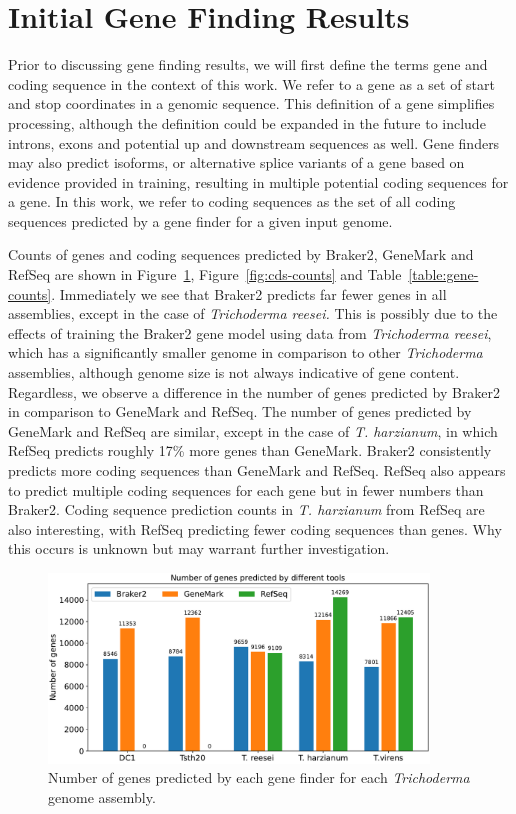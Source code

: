 \section{Initial Gene Finding Results}\label{section:gene-finding}

Prior to discussing gene finding results, we will first define the
terms gene and coding sequence in the context of this work. We refer
to a gene as a set of start and stop coordinates in a genomic
sequence. This definition of a gene simplifies processing, although
the definition could be expanded in the future to include introns,
exons and potential up and downstream sequences as well. Gene finders
may also predict isoforms, or alternative splice variants of a gene
based on evidence provided in training, resulting in multiple
potential coding sequences for a gene. In this work, we refer to
coding sequences as the set of all coding sequences predicted by a
gene finder for a given input genome.

Counts of genes and coding sequences predicted by Braker2, GeneMark
and RefSeq are shown in Figure~\ref{fig:gene-counts},
Figure~\ref{fig:cds-counts} and
Table~\ref{table:gene-counts}. Immediately we see that Braker2
predicts far fewer genes in all assemblies, except in the case of
\textit{Trichoderma reesei.} This is possibly due to the effects of
training the Braker2 gene model using data from \textit{Trichoderma
  reesei}, which has a significantly smaller genome in comparison to
other \textit{Trichoderma} assemblies, although genome size is not
always indicative of gene content. Regardless, we observe a difference
in the number of genes predicted by Braker2 in comparison to GeneMark
and RefSeq. The number of genes predicted by GeneMark and RefSeq are
similar, except in the case of \textit{T. harzianum}, in which RefSeq
predicts roughly 17\% more genes than GeneMark. Braker2 consistently
predicts more coding sequences than GeneMark and RefSeq. RefSeq also
appears to predict multiple coding sequences for each gene but in
fewer numbers than Braker2. Coding sequence prediction counts in
\textit{T. harzianum} from RefSeq are also interesting, with RefSeq
predicting fewer coding sequences than genes. Why this occurs is
unknown but may warrant further investigation.

\begin{figure}
  \centering
  \includegraphics[width=0.9\textwidth]{figures/gene-counts-barplot.pdf}
  \caption[Number of genes predicted]{Number of genes predicted by each gene finder for each \textit{Trichoderma} genome assembly.}\label{fig:gene-counts}
\end{figure}

